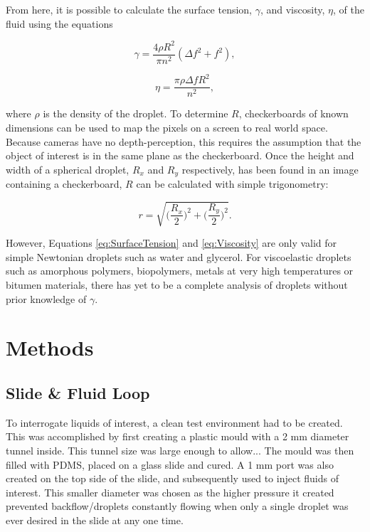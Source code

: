 \documentclass{physics_article_B}
\begin{document}
From here, it is possible to calculate the surface tension, $\gamma$, and viscosity, $\eta$, of the fluid using the equations
 
    \begin{equation} 
    \label{eq:SurfaceTension}
    \gamma = \frac{4\rho R^{2}}{\pi n^{2}}(\Delta f^{2} + f^{2}),
    \end{equation}
    
    \begin{equation} 
    \label{eq:Viscosity}
    \eta = \frac{\pi \rho \Delta f R^{2}}{n^{2}},
    \end{equation}

where $\rho$ is the density of the droplet. To determine $R$, checkerboards of known dimensions can be used to map the pixels on a screen to real world space. Because cameras have no depth-perception, this requires the assumption that the object of interest is in the same plane as the checkerboard. Once the height and width of a spherical droplet, $R_x$ and $R_y$ respectively, has been found in an image containing a checkerboard, $R$ can be calculated with simple trigonometry:
            
            \begin{equation}\label{eq:radii}
                r = \sqrt{\Big(\frac{R_x}{2}\Big)^2 + \Big(\frac{R_y}{2}\Big)^2} .
            \end{equation}
    
However, Equations \ref{eq:SurfaceTension} and \ref{eq:Viscosity} are only valid for simple Newtonian droplets such as water and glycerol. For viscoelastic droplets such as amorphous polymers, biopolymers, metals at very high temperatures or bitumen materials, there has yet to be a complete analysis of droplets without prior knowledge of $\gamma$.
\section{Methods\label{sect:method}}

    \subsection{Slide \& Fluid Loop\label{sect:method:slide}}
    
        To interrogate liquids of interest, a clean test environment had to be created. This was accomplished by first creating a plastic mould with a 2 mm diameter tunnel inside. This tunnel size was large enough to allow...  The mould was then filled with PDMS, placed on a glass slide and cured. A 1 mm port was also created on the top side of the slide, and subsequently used to inject fluids of interest. This smaller diameter was chosen as the higher pressure it created prevented backflow/droplets constantly flowing when only a single droplet was ever desired in the slide at any one time.
        
\end{document}
